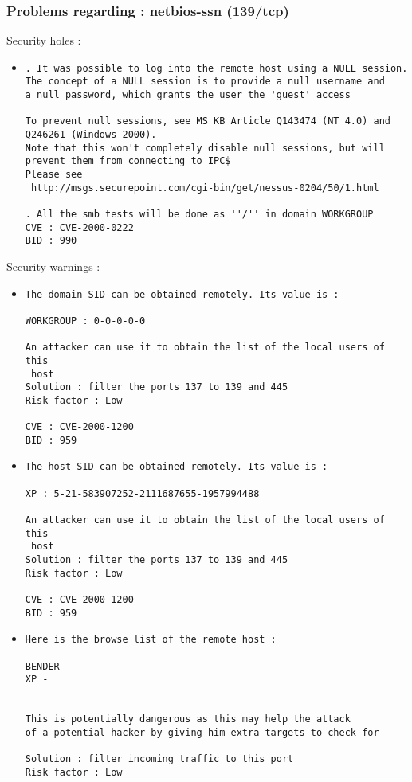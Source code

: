 \documentclass{article}
\begin{document}
\subsubsection{Problems regarding : netbios-ssn (139/tcp)}
Security holes :\\
\begin{itemize}
\item \begin{verbatim}
. It was possible to log into the remote host using a NULL session.
The concept of a NULL session is to provide a null username and
a null password, which grants the user the 'guest' access

To prevent null sessions, see MS KB Article Q143474 (NT 4.0) and
Q246261 (Windows 2000). 
Note that this won't completely disable null sessions, but will 
prevent them from connecting to IPC$
Please see
 http://msgs.securepoint.com/cgi-bin/get/nessus-0204/50/1.html

. All the smb tests will be done as ''/'' in domain WORKGROUP      
CVE : CVE-2000-0222
BID : 990
\end{verbatim}\end{itemize}
Security warnings :\\
\begin{itemize}
\item \begin{verbatim}
The domain SID can be obtained remotely. Its value is :

WORKGROUP : 0-0-0-0-0

An attacker can use it to obtain the list of the local users of this
 host
Solution : filter the ports 137 to 139 and 445
Risk factor : Low

CVE : CVE-2000-1200
BID : 959
\end{verbatim}\item \begin{verbatim}
The host SID can be obtained remotely. Its value is :

XP : 5-21-583907252-2111687655-1957994488

An attacker can use it to obtain the list of the local users of this
 host
Solution : filter the ports 137 to 139 and 445
Risk factor : Low

CVE : CVE-2000-1200
BID : 959
\end{verbatim}\item \begin{verbatim}
Here is the browse list of the remote host : 

BENDER - 
XP - 


This is potentially dangerous as this may help the attack
of a potential hacker by giving him extra targets to check for

Solution : filter incoming traffic to this port
Risk factor : Low

\end{verbatim}\end{itemize}
\end{document}

